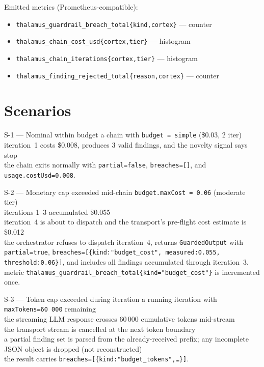 Emitted metrics (Prometheus-compatible):
\begin{itemize}[leftmargin=1.2em]
  \item \texttt{thalamus\_guardrail\_breach\_total\{kind,cortex\}} --- counter
  \item \texttt{thalamus\_chain\_cost\_usd\{cortex,tier\}} --- histogram
  \item \texttt{thalamus\_chain\_iterations\{cortex,tier\}} --- histogram
  \item \texttt{thalamus\_finding\_rejected\_total\{reason,cortex\}} --- counter
\end{itemize}

\section{Scenarios}

\begin{scenario}{S-1 --- Nominal within budget}
\Given a chain with \texttt{budget = simple} (\$0.03, 2 iter) \\
\When iteration~1 costs \$0.008, produces 3 valid findings, and the novelty signal says stop \\
\Then the chain exits normally with \texttt{partial=false}, \texttt{breaches=[]}, and \texttt{usage.costUsd=0.008}.
\end{scenario}

\begin{scenario}{S-2 --- Monetary cap exceeded mid-chain}
\Given \texttt{budget.maxCost = 0.06} (moderate tier) \\
\And iterations 1--3 accumulated \$0.055 \\
\When iteration~4 is about to dispatch and the transport's pre-flight cost estimate is \$0.012 \\
\Then the orchestrator refuses to dispatch iteration~4, returns \texttt{GuardedOutput} with \texttt{partial=true}, \texttt{breaches=[\{kind:"budget\_cost", measured:0.055, threshold:0.06\}]}, and includes all findings accumulated through iteration~3. \\
\And metric \texttt{thalamus\_guardrail\_breach\_total\{kind="budget\_cost"\}} is incremented once.
\end{scenario}

\begin{scenario}{S-3 --- Token cap exceeded during iteration}
\Given a running iteration with \texttt{maxTokens=60\,000} remaining \\
\When the streaming LLM response crosses 60\,000 cumulative tokens mid-stream \\
\Then the transport stream is cancelled at the next token boundary \\
\And a partial finding set is parsed from the already-received prefix; any incomplete JSON object is dropped (not reconstructed) \\
\And the result carries \texttt{breaches=[\{kind:"budget\_tokens",\dots\}]}.
\end{scenario}

